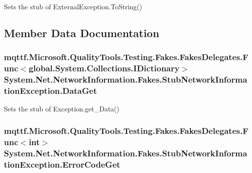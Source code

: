 Sets the stub of External\-Exception.\-To\-String()



\subsection{Member Data Documentation}
\hypertarget{class_system_1_1_net_1_1_network_information_1_1_fakes_1_1_stub_network_information_exception_a6a80133f776520a99a18b0cf3c89f651}{
\subsubsection[{Data\-Get}]{\setlength{\rightskip}{0pt plus 5cm}mqttf.\-Microsoft.\-Quality\-Tools.\-Testing.\-Fakes.\-Fakes\-Delegates.\-Func$<$global.\-System.\-Collections.\-I\-Dictionary$>$ System.\-Net.\-Network\-Information.\-Fakes.\-Stub\-Network\-Information\-Exception.\-Data\-Get}}\label{class_system_1_1_net_1_1_network_information_1_1_fakes_1_1_stub_network_information_exception_a6a80133f776520a99a18b0cf3c89f651}


Sets the stub of Exception.\-get\-\_\-\-Data()

\hypertarget{class_system_1_1_net_1_1_network_information_1_1_fakes_1_1_stub_network_information_exception_aefd6aac3e98b2b425485b1013c2d8c06}{
\subsubsection[{Error\-Code\-Get}]{\setlength{\rightskip}{0pt plus 5cm}mqttf.\-Microsoft.\-Quality\-Tools.\-Testing.\-Fakes.\-Fakes\-Delegates.\-Func$<$int$>$ System.\-Net.\-Network\-Information.\-Fakes.\-Stub\-Network\-Information\-Exception.\-Error\-Code\-Get}}\label{class_system_1_1_net_1_1_network_information_1_1_fakes_1_1_stub_network_information_exception_aefd6aac3e98b2b425485b1013c2d8c06}



